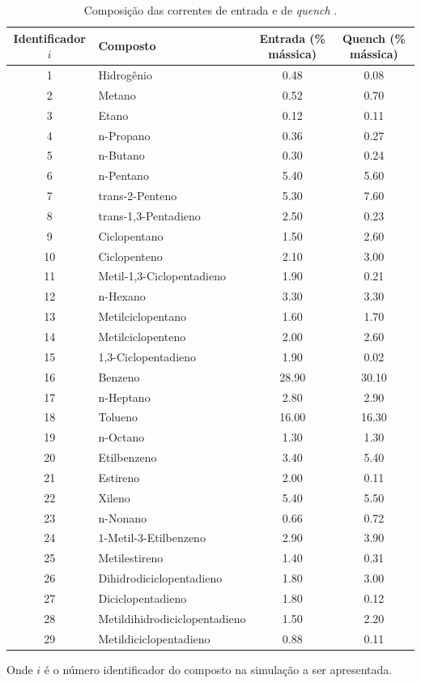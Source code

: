\begin{table}[!htb]
\begin{center}
\caption{Composição das correntes de entrada e de \emph{quench}
\cite{Rojas2014a}.}
\label{tab:composicao}
\small
\begin{tabular}{clcc}
{Identificador $i$} & {Composto} & Entrada (\% mássica) & Quench (\% mássica)
\\
\hline
1 & Hidrogênio				& \num{0,48} & \num{0,08} \\
2 & Metano					& \num{0,52} & \num{0,70} \\
3 & Etano					& \num{0,12} & \num{0,11} \\
4 & n-Propano				& \num{0,36} & \num{0,27} \\
5 & n-Butano				& \num{0,30} & \num{0,24} \\
6 & n-Pentano				& \num{5,40} & \num{5,60} \\
7 & trans-2-Penteno			& \num{5,30} & \num{7,60} \\
8 & trans-1,3-Pentadieno	& \num{2,50} & \num{0,23} \\
9 & Ciclopentano			& \num{1,50} & \num{2,60} \\
10& Ciclopenteno			& \num{2,10} & \num{3,00} \\
11& Metil-1,3-Ciclopentadieno	& \num{1,90} & \num{0,21} \\
12& n-Hexano				& \num{3,30} & \num{3,30} \\
13& Metilciclopentano		& \num{1,60} & \num{1,70} \\
14& Metilciclopenteno		& \num{2,00} & \num{2,60} \\
15& 1,3-Ciclopentadieno		& \num{1,90} & \num{0,02} \\
16& Benzeno					& \num{28,90} & \num{30,10} \\
17& n-Heptano				& \num{2,80} & \num{2,90} \\
18& Tolueno					& \num{16,00} & \num{16,30} \\
19& n-Octano				& \num{1,30} & \num{1,30} \\
20& Etilbenzeno				& \num{3,40} & \num{5,40} \\
21& Estireno				& \num{2,00} & \num{0,11} \\
22& Xileno					& \num{5,40} & \num{5,50} \\
23& n-Nonano				& \num{0,66} & \num{0,72} \\
24& 1-Metil-3-Etilbenzeno	& \num{2,90} & \num{3,90} \\
25& Metilestireno			& \num{1,40} & \num{0,31} \\
26& Dihidrodiciclopentadieno	& \num{1,80} & \num{3,00} \\
27& Diciclopentadieno		& \num{1,80} & \num{0,12} \\
28& Metildihidrodiciclopentadieno	& \num{1,50} & \num{2,20} \\
29& Metildiciclopentadieno	& \num{0,88} & \num{0,11} \\
\bottomrule
\end{tabular}
\end{center}
Onde $i$ é o número identificador do composto na simulação a ser apresentada.
\end{table}


